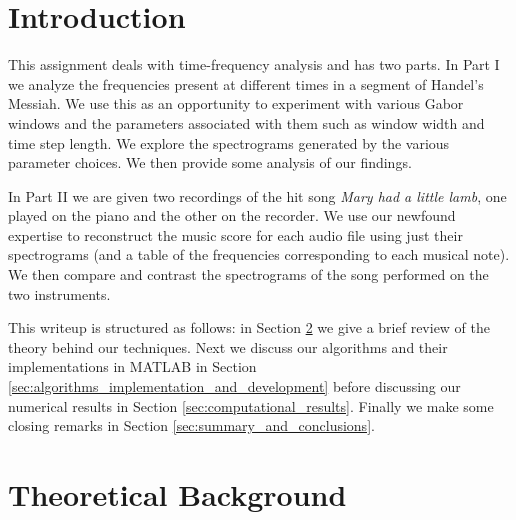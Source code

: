 \documentclass[fleqn,10pt]{../SelfArx} %
\affiliation{\textsuperscript{1}\textit{Department of Applied Mathematics, University of Washington, Seattle}} %
\begin{document}
\flushbottom %

\maketitle %

\tableofcontents %



\section{Introduction}
\label{sec:introduction}
This assignment deals with time-frequency analysis and has two parts. In Part I we analyze the frequencies present at different times in a segment of Handel's Messiah. We use this as an opportunity to experiment with various Gabor windows and the parameters associated with them such as window width and time step length. We explore the spectrograms generated by the various parameter choices. We then provide some analysis of our findings.

In Part II we are given two recordings of the hit song \textit{Mary had a little lamb}, one played on the piano and the other on the recorder. We use our newfound expertise to reconstruct the music score for each audio file using just their spectrograms (and a table of the frequencies corresponding to each musical note). We then compare and contrast the spectrograms of the song performed on the two instruments.

This writeup is structured as follows: in Section \ref{sec:theoretical_background} we give a brief review of the theory behind our techniques. Next we discuss our algorithms and their implementations in MATLAB in Section \ref{sec:algorithms_implementation_and_development} before discussing our numerical results in Section \ref{sec:computational_results}. Finally we make some closing remarks in Section \ref{sec:summary_and_conclusions}.



\section{Theoretical Background} %
\label{sec:theoretical_background}
\end{document}
